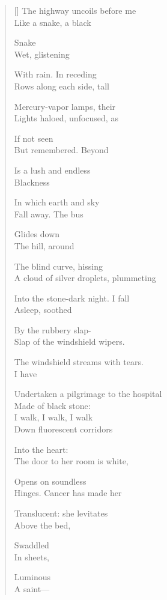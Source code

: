 \label{ch:notime}
\settowidth{\versewidth}{To the black hills coiled by the roadside, the}
\begin{verse}[\versewidth]
The highway uncoils before me\\
Like a snake, a black

Snake\\
Wet, glistening

With rain.     In receding\\
Rows along each side, tall

Mercury-vapor lamps, their\\
Lights haloed, unfocused, as

If not seen\\
But remembered.     Beyond

Is a lush and endless\\
Blackness

In which earth and sky\\
Fall away.     The bus

Glides down\\
The hill, around

The blind curve, hissing\\
A cloud of silver droplets, plummeting

Into the stone-dark night.     I fall\\
Asleep, soothed

By the rubbery slap-\\
Slap of the windshield wipers.

The windshield streams with tears.\\
I have

Undertaken a pilgrimage to the hospital\\
Made of black stone:\\

I walk, I walk, I walk\\
Down fluorescent corridors

Into the heart:\\
The door to her room is white,

Opens on soundless\\
Hinges.     Cancer has made her

Translucent: she levitates\\
Above the bed,

Swaddled\\
In sheets,

Luminous\\
A saint---


\end{verse}

